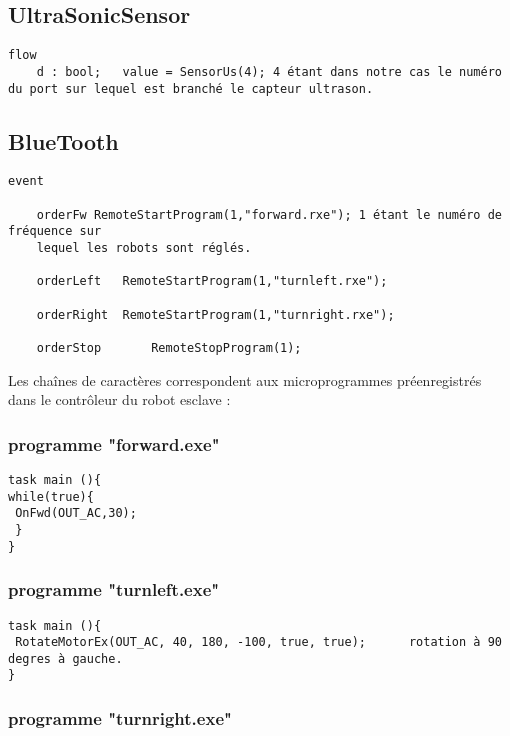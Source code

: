 \subsection{UltraSonicSensor}

\begin{verbatim}
flow
    d : bool;	value = SensorUs(4); 4 étant dans notre cas le numéro du port sur lequel est branché le capteur ultrason.

\end{verbatim}

\subsection{BlueTooth}

\begin{verbatim}
event

	orderFw	RemoteStartProgram(1,"forward.rxe"); 1 étant le numéro de fréquence sur 
	lequel les robots sont réglés.
	
	orderLeft	RemoteStartProgram(1,"turnleft.rxe");
	
	orderRight	RemoteStartProgram(1,"turnright.rxe");
	
	orderStop		RemoteStopProgram(1);
\end{verbatim}

	Les chaînes de caractères correspondent aux microprogrammes préenregistrés dans le contrôleur du robot esclave :
	
\subsubsection{programme "forward.exe"}
	
\begin{verbatim}
task main (){
while(true){
 OnFwd(OUT_AC,30);
 }
}
\end{verbatim}

\subsubsection{programme "turnleft.exe" }

\begin{verbatim}
task main (){
 RotateMotorEx(OUT_AC, 40, 180, -100, true, true);		rotation à 90 degres à gauche.
}
\end{verbatim}

\subsubsection{programme "turnright.exe"}

